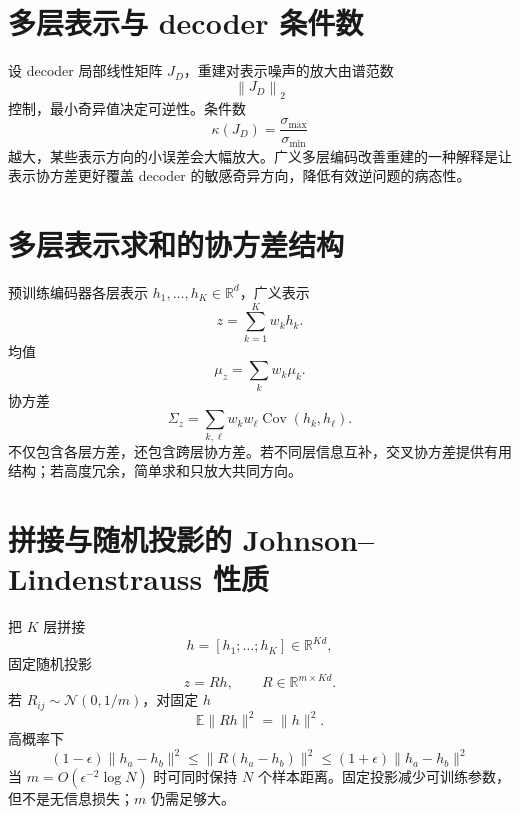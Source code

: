 \documentclass[UTF8,12pt,a4paper,fontset=none]{ctexart}
\numberwithin{equation}{section}
\newcommand{\R}{\mathbb{R}}
\newcommand{\E}{\mathbb{E}}
\newcommand{\norm}[1]{\left\lVert #1\right\rVert}
\begin{document}
\section{多层表示与 decoder 条件数}
设 decoder 局部线性矩阵 $J_D$，重建对表示噪声的放大由谱范数
\begin{equation}
 \norm{J_D}_2
\end{equation}
控制，最小奇异值决定可逆性。条件数
\begin{equation}
 \kappa(J_D)=\frac{\sigma_{\max}}{\sigma_{\min}}
\end{equation}
越大，某些表示方向的小误差会大幅放大。广义多层编码改善重建的一种解释是让表示协方差更好覆盖 decoder 的敏感奇异方向，降低有效逆问题的病态性。
\clearpage
\section{多层表示求和的协方差结构}
预训练编码器各层表示 $h_1,\ldots,h_K\in\R^d$，广义表示
\begin{equation}
 z=\sum_{k=1}^{K}w_kh_k.
\end{equation}
均值
\begin{equation}
 \mu_z=\sum_kw_k\mu_k.
\end{equation}
协方差
\begin{equation}
 \Sigma_z=\sum_{k,\ell}w_kw_\ell
 \operatorname{Cov}(h_k,h_\ell).
\end{equation}
不仅包含各层方差，还包含跨层协方差。若不同层信息互补，交叉协方差提供有用结构；若高度冗余，简单求和只放大共同方向。

\section{拼接与随机投影的 Johnson--Lindenstrauss 性质}
把 $K$ 层拼接
\begin{equation}
 h=[h_1;\ldots;h_K]\in\R^{Kd},
\end{equation}
固定随机投影
\begin{equation}
 z=Rh,
 \qquad R\in\R^{m\times Kd}.
\end{equation}
若 $R_{ij}\sim\mathcal N(0,1/m)$，对固定 $h$
\begin{equation}
 \E\|Rh\|^2=\|h\|^2.
\end{equation}
高概率下
\begin{equation}
 (1-\epsilon)\|h_a-h_b\|^2
 \le\|R(h_a-h_b)\|^2
 \le(1+\epsilon)\|h_a-h_b\|^2
\end{equation}
当 $m=O(\epsilon^{-2}\log N)$ 时可同时保持 $N$ 个样本距离。固定投影减少可训练参数，但不是无信息损失；$m$ 仍需足够大。
\end{document}
